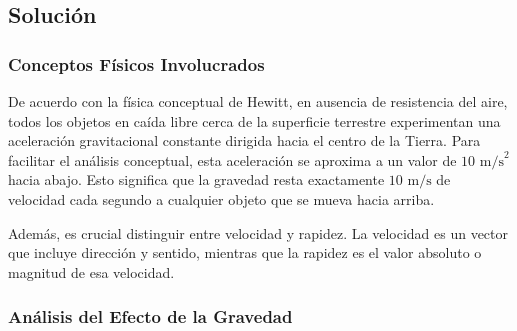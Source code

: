 \documentclass[12pt, a4paper]{article}
\begin{document}
\vspace{0.5cm}

\begin{center}
\end{center}

\subsection*{Solución}

\subsubsection*{Conceptos Físicos Involucrados}

De acuerdo con la física conceptual de Hewitt, en ausencia de resistencia del aire, todos los objetos en caída libre cerca de la superficie terrestre experimentan una aceleración gravitacional constante dirigida hacia el centro de la Tierra. Para facilitar el análisis conceptual, esta aceleración se aproxima a un valor de $10 \text{ m/s}^2$ hacia abajo. Esto significa que la gravedad resta exactamente $10 \text{ m/s}$ de velocidad cada segundo a cualquier objeto que se mueva hacia arriba.

Además, es crucial distinguir entre velocidad y rapidez. La velocidad es un vector que incluye dirección y sentido, mientras que la rapidez es el valor absoluto o magnitud de esa velocidad.

\subsubsection*{Análisis del Efecto de la Gravedad}
\end{document}
